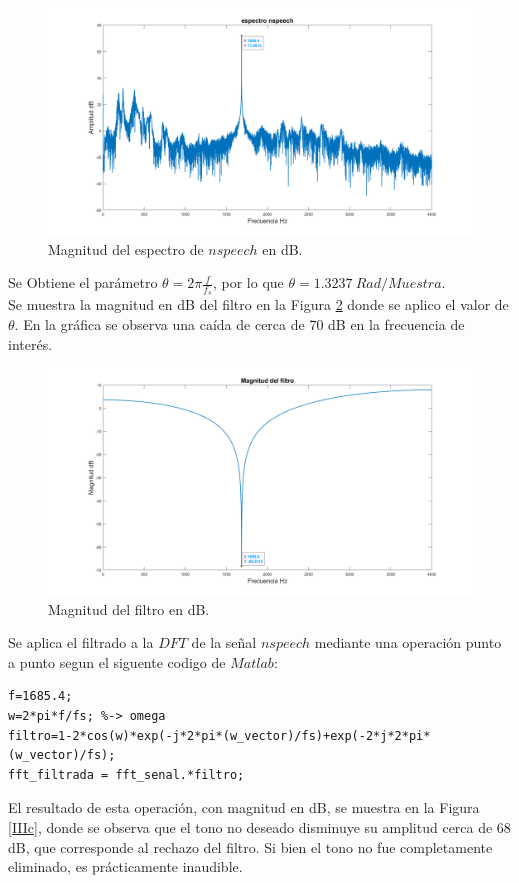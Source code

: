 \documentclass[letterpaper,onecolumn,10pt,journal,final]{IEEEtran}
\begin{document}
\begin{figure}[H]
\centering
\includegraphics[width=1 \linewidth]{Figuras/IIIa.png}
\caption{Magnitud del espectro de $nspeech$ en dB.}
\label{IIIa}
\end{figure} 

Se Obtiene el parámetro $\theta = 2 \pi \frac{f}{f_s}$, por lo que $\theta = 1.3237 ~ Rad/Muestra$. \\

Se muestra la magnitud en dB del filtro en la Figura \ref{IIIb} donde se aplico el valor de $\theta$. En la gráfica se observa una caída de cerca de 70 dB en la frecuencia de interés.

\begin{figure}[H]
\centering
\includegraphics[width=1 \linewidth]{Figuras/IIIb.png}
\caption{Magnitud del filtro en dB.}
\label{IIIb}
\end{figure} 

Se aplica el filtrado a la $DFT$ de la señal $nspeech$ mediante una operación punto a punto segun el siguente codigo de $Matlab$:
\begin{lstlisting}
f=1685.4; 
w=2*pi*f/fs; %-> omega
filtro=1-2*cos(w)*exp(-j*2*pi*(w_vector)/fs)+exp(-2*j*2*pi*(w_vector)/fs);
fft_filtrada = fft_senal.*filtro;
\end{lstlisting}
El resultado de esta operación, con magnitud en dB, se muestra en la Figura \ref{IIIc}, donde se observa que el tono no deseado disminuye su amplitud cerca de 68 dB, que corresponde al rechazo del filtro. Si bien el tono no fue completamente eliminado, es prácticamente inaudible. 
\end{document}
